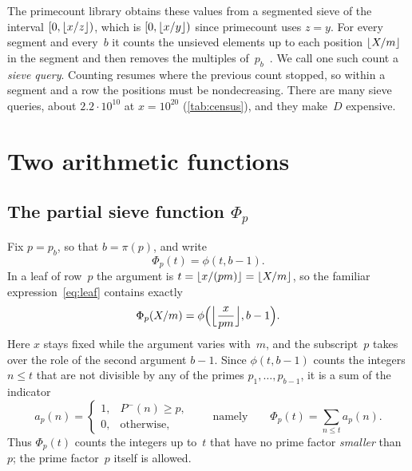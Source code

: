 \documentclass[11pt,a4paper]{amsart}
\numberwithin{equation}{section}
\DeclarePairedDelimiter{\floor}{\lfloor}{\rfloor}
\newcommand{\Pminus}{P^{-}}
\begin{document}
The primecount library obtains these values from a segmented sieve of the
interval $[0,\floor{x/z})$, which is $[0,\floor{x/y})$ since primecount uses
$z=y$. For every segment and every~$b$ it counts the unsieved
elements up to each position $\floor{X/m}$ in the segment and then removes the
multiples of~$p_b$~\cite{Walisch2025hard}. We call one such count a
\emph{sieve query}. Counting resumes where the previous count stopped, so
within a segment and a row the positions must be nondecreasing. There are many
sieve queries, about $2.2\cdot10^{10}$ at $x=10^{20}$ (\cref{tab:census}), and
they make~$D$ expensive.

\section{Two arithmetic functions}\label{sec:functions}

\subsection{The partial sieve function \texorpdfstring{$\Phi_p$}{Φp}}
Fix $p=p_b$, so that $b=\pi(p)$, and write
\begin{equation}\label{eq:Phi}
  \Phi_p(t)=\phi(t,b-1).
\end{equation}
In a leaf of row~$p$ the argument is $t=\floor{x/(pm)}=\floor{X/m}$, so the
familiar expression~\eqref{eq:leaf} contains exactly
\begin{equation}\label{eq:Phileaf}
  \Phi_p(X/m)=\phi\Bigl(\Bigl\lfloor\frac{x}{pm}\Bigr\rfloor,b-1\Bigr).
\end{equation}
Here $x$ stays fixed while the argument varies with~$m$, and the subscript~$p$
takes over the role of the second argument $b-1$. Since $\phi(t,b-1)$ counts
the integers $n\le t$ that are not divisible by any of the primes
$p_1,\dots,p_{b-1}$, it is a sum of the indicator
\begin{equation}\label{eq:a}
  a_p(n)=\begin{cases}1, & \Pminus(n)\ge p,\\ 0, & \text{otherwise},\end{cases}
  \qquad\text{namely}\qquad
  \Phi_p(t)=\sum_{n\le t}a_p(n).
\end{equation}
Thus $\Phi_p(t)$ counts the integers up to~$t$ that have no prime factor
\emph{smaller} than~$p$; the prime factor~$p$ itself is allowed.
\end{document}
